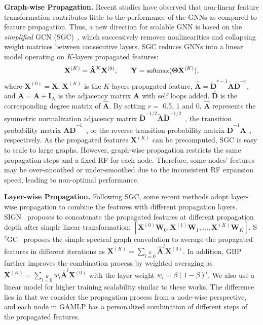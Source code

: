 \documentclass[sigconf]{acmart}
\begin{document}
\noindent\textbf{Graph-wise Propagation.} 
Recent studies have observed that non-linear feature transformation contributes little to the performance of the GNNs as compared to feature propagation.
Thus, a new direction for scalable GNN is based on the \emph{simplified} GCN (SGC)~\citep{wu2019simplifying}, which successively removes nonlinearities and collapsing weight matrices between consecutive layers. 
SGC reduces GNNs into a linear model operating on $K$-layers propagated features: 
\begin{equation}
\small
    \mathbf{X}^{(K)}=\mathbf{\hat{A}}^K \mathbf{X}^{(0)}, \qquad  \mathbf{Y} = \text{softmax}(\mathbf{\Theta} \mathbf{X}^{(K)}),
\end{equation}
\label{eq_GC}
\noindent\ignorespacesafterend
where $\mathbf{X}^{(0)} =\mathbf{X}$, $\mathbf{X}^{(K)}$ is the $K$-layers propagated feature, $\mathbf{\hat{A}} = \widetilde{\mathbf{D}}^{r-1}\widetilde{\mathbf{A}}\widetilde{\mathbf{D}}^{-r}$, and $\widetilde{\mathbf{A}}=\mathbf{A}+\mathbf{I}_{N}$ is the adjacency matrix $\mathbf{A}$ with self loops added.
$\mathbf{\hat{D}}$ is the corresponding degree matrix of $\mathbf{\hat{A}}$.
By setting $r = $ 0.5, 1 and 0, $\mathbf{\hat{A}}$ represents the symmetric normalization adjacency matrix  $\widetilde{\mathbf{D}}^{-1/2}\widetilde{\mathbf{A}}\widetilde{\mathbf{D}}^{-1/2}$~\citep{DBLP:conf/iclr/KlicperaBG19}, the transition probability matrix $\widetilde{\mathbf{A}}\widetilde{\mathbf{D}}^{-1}$~\citep{DBLP:conf/iclr/ZengZSKP20}, or the reverse transition probability matrix $\widetilde{\mathbf{D}}^{-1}\widetilde{\mathbf{A}}$~\citep{xu2018representation}, respectively. 
As the propagated features  $\mathbf{X}^{(K)}$ can be precomputed, SGC is easy to scale to large graphs. However, graph-wise propagation restricts the same propagation steps and a fixed RF for each node. Therefore, some nodes' features may be over-smoothed or under-smoothed due to the inconsistent RF expansion speed, leading to non-optimal performance.


\noindent\textbf{Layer-wise Propagation.} Following SGC, some recent methods adopt layer-wise propagation to combine the features with different propagation layers. SIGN~\citep{frasca2020sign} proposes to concatenate the propagated features at different propagation depth after simple linear transformation: $[\mathbf{X}^{(0)}\mathbf{W}_0, \mathbf{X}^{(1)}\mathbf{W}_1, ..., \mathbf{X}^{(K)}\mathbf{W}_K]$. S$^2$GC~\citep{zhu2021simple} proposes the simple spectral graph convolution to average the propagated features in different iterations as $\mathbf{X}^{(K)} = \sum \limits_{l=0}\limits^{K}\mathbf{\hat{A}}^l \mathbf{X}^{(0)}$. In addition, GBP~\citep{DBLP:conf/nips/ChenWDL00W20} further improves the combination process by weighted averaging as $\mathbf{X}^{(K)} = \sum \limits_{l=0}\limits^{K} w_l\mathbf{\hat{A}}^l \mathbf{X}^{(0)}$ with the layer weight $w_l = \beta {(1-\beta)}^l$.
We also use a linear model for higher training scalability similar to these works. 
The difference lies in that we consider the propagation process from a node-wise perspective, and each node in GAMLP has a personalized combination of different steps of the propagated features.
\end{document}
